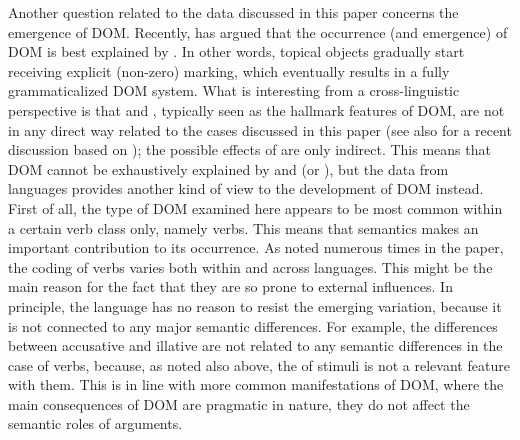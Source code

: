 \documentclass[output=paper]{LSP/langsci}
\begin{document}
 Another question related to the data discussed in this paper concerns the emergence of DOM. Recently, \citet{Iemmolo2011Towards} has argued that the occurrence (and emergence) of DOM is best explained by . In other words, topical objects gradually start receiving explicit (non-zero) marking, which eventually results in a fully grammaticalized DOM system. What is interesting from a cross-linguistic perspective is that  and , typically seen as the hallmark features of DOM, are not in any direct way related to the cases discussed in this paper (see also \citealt{Iemmolo2011Towards} for a recent discussion based on ); the possible effects of  are only indirect. This means that DOM cannot be exhaustively explained by  and  (or ), but the data from  languages provides another kind of view to the development of DOM instead. First of all, the type of DOM examined here appears to be most common within a certain verb class only, namely  verbs. This means that semantics makes an important contribution to its occurrence. As noted numerous times in the paper, the coding of  verbs varies both within and across languages. This might be the main reason for the fact that they are so prone to external influences. In principle, the language has no reason to resist the emerging variation, because it is not connected to any major semantic differences. For example, the differences between accusative and illative are not related to any semantic differences in the case of  verbs, because, as noted also above, the  of stimuli is not a relevant feature with them. This is in line with more common manifestations of DOM, where the main consequences of DOM are pragmatic in nature, \ie they do not affect the semantic roles of arguments.
\end{document}
